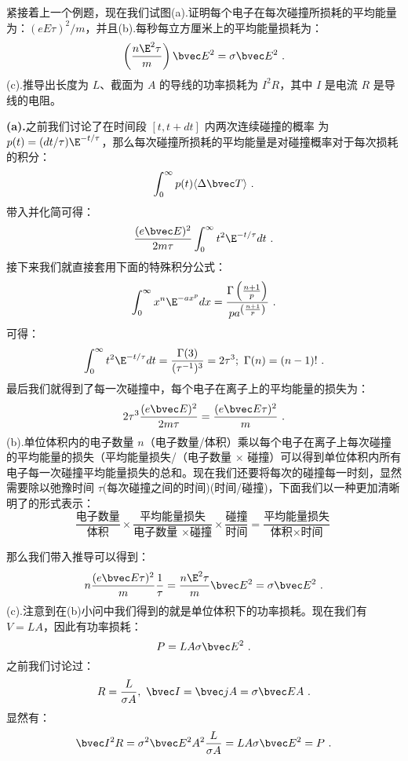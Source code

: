 \begin{exercise}{}
紧接着上一个例题，现在我们试图(a).证明每个电子在每次碰撞所损耗的平均能量为：$(eE\tau)^2/m$，并且(b).每秒每立方厘米上的平均能量损耗为：
\begin{equation}
\left(\frac{n\E^2\tau}{m}\right)\bvec E^2=\sigma \bvec E^2~.
\end{equation}
(c).推导出长度为 $L$、截面为 $A$ 的导线的功率损耗为 $I^2R$，其中 $I$ 是电流 $R$ 是导线的电阻。

\textbf{(a).}之前我们讨论了在时间段 $[t, t + dt]$ 内两次连续碰撞的概率
为 $p(t)=(dt/\tau)\E^{- t/\tau}$，那么每次碰撞所损耗的平均能量是对碰撞概率对于每次损耗的积分：
\begin{equation}
\int_0^\infty p(t) \langle\Delta\bvec T\rangle~.
\end{equation}
带入并化简可得：
\begin{equation}
\frac{(e\bvec E)^2}{2m\tau}\int_0^\infty t^2 \E^{- t/\tau}dt~.
\end{equation}
接下来我们就直接套用下面的特殊积分公式：
\begin{equation}
\int_0^\infty x^n \E^{-ax^p}dx = \frac{\Gamma\left(\frac{n+1}{p}\right)}{pa^{\left(\frac{n+1}{p}\right)}}~.
\end{equation}
可得：
\begin{equation}
\int_0^\infty t^2 \E^{- t/\tau}dt=\frac{\Gamma(3)}{(\tau^{-1})^3}=2\tau^3;\ \Gamma(n)=(n-1)!~.
\end{equation}
最后我们就得到了每一次碰撞中，每个电子在离子上的平均能量的损失为：
\begin{equation}
2\tau^3\frac{(e\bvec E)^2}{2m\tau}=\frac{(e\bvec E\tau)^2}{m}~.
\end{equation}
(b).单位体积内的电子数量 $n$（电子数量/体积）乘以每个电子在离子上每次碰撞的平均能量的损失（平均能量损失/（电子数量 $\times$ 碰撞）可以得到单位体积内所有电子每一次碰撞平均能量损失的总和。现在我们还要将每次的碰撞每一时刻，显然需要除以弛豫时间 $\tau$(每次碰撞之间的时间)(时间/碰撞)，下面我们以一种更加清晰明了的形式表示：
\begin{equation}
\frac{\text{电子数量}}{\text{体积}}\times \frac{\text{平均能量损失}}{\text{电子数量 }\times \text{碰撞}}\times\frac{\text{碰撞}}{\text{时间}}=\frac{\text{平均能量损失}}{\text{体积}\times \text{时间}}~
\end{equation}

那么我们带入推导可以得到：
\begin{equation}
n \frac{(e\bvec E\tau)^2}{m} \frac{1}{\tau} = \frac{n\E^2\tau}{m}\bvec E^2 = \sigma \bvec E^2~.
\end{equation}
(c).注意到在(b)小问中我们得到的就是单位体积下的功率损耗。现在我们有 $V=LA$，因此有功率损耗：
\begin{equation}
P = LA\sigma \bvec E^2~.
\end{equation}
之前我们讨论过：
\begin{equation}
R = \frac{L}{\sigma A},\ \bvec I = \bvec j A=\sigma\bvec E A~.
\end{equation}
显然有：
\begin{equation}
\bvec I^2 R=\sigma^2\bvec E^2 A^2 \frac{L}{\sigma A} = LA\sigma \bvec E^2 = P~.
\end{equation}
\end{exercise}




